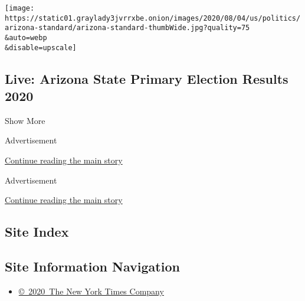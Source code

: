 \begin{enumerate}
  \texttt{[image: https://static01.graylady3jvrrxbe.onion/images/2020/08/04/us/politics/arizona-standard/arizona-standard-thumbWide.jpg?quality=75\\\&auto=webp\\\&disable=upscale]}

  \hypertarget{live-arizona-state-primary-election-results-2020}{%
  \subsection{Live: Arizona State Primary Election Results
  2020}\label{live-arizona-state-primary-election-results-2020}}
\end{enumerate}

Show More

Advertisement

\protect\hyperlink{after-mid2}{Continue reading the main story}

Advertisement

\protect\hyperlink{after-mktg}{Continue reading the main story}

\hypertarget{site-index}{%
\subsection{Site Index}\label{site-index}}

\hypertarget{site-information-navigation}{%
\subsection{Site Information
Navigation}\label{site-information-navigation}}

\begin{itemize}
\tightlist
\item
  \href{https://help.nytimes3xbfgragh.onion/hc/en-us/articles/115014792127-Copyright-notice}{©~2020~The
  New York Times Company}
\end{itemize}

